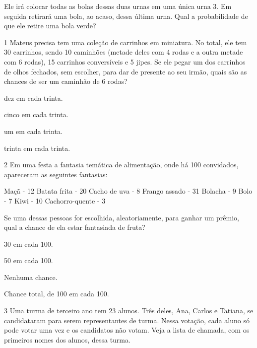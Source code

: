 Ele irá colocar todas as bolas dessas duas urnas em uma única urna 3. Em
seguida retirará uma bola, ao acaso, dessa última urna. Qual a
probabilidade de que ele retire uma bola verde?






\num{1} Mateus precisa tem uma coleção de carrinhos em miniatura. No total, ele tem 30 carrinhos, sendo 10 caminhões (metade deles com 4 rodas e a outra metade com 6 rodas), 15 carrinhos conversíveis e 5 jipes. Se ele pegar um dos carrinhos de olhos fechados, sem escolher, para dar de presente ao seu irmão, quais são as chances de ser um caminhão de 6 rodas?

\begin{escolha}
\item
  dez em cada trinta.
\item
  cinco em cada trinta.
\item
  um em cada trinta.
\item
  trinta em cada trinta.
\end{escolha}


\num{2} Em uma festa a fantasia temática de alimentação, onde há 100 convidados, apareceram as seguintes fantasias:

Maçã - 12
Batata frita - 20
Cacho de uva - 8
Frango assado - 31
Bolacha - 9
Bolo - 7
Kiwi - 10
Cachorro-quente - 3

Se uma dessas pessoas for escolhida, aleatoriamente, para ganhar um prêmio, qual a chance de ela estar fantasiada de fruta?

\begin{escolha}
\item
30 em cada 100.
\item
50 em cada 100.
\item
Nenhuma chance.
\item
Chance total, de 100 em cada 100.
\end{escolha}


\num{3} Uma turma de terceiro ano tem 23 alunos. Três deles, Ana, Carlos e Tatiana, se candidataram para serem representantes de turma. Nessa votação, cada aluno só pode votar uma vez e os candidatos não votam. Veja a lista de chamada, com os primeiros nomes dos alunos, dessa turma.

